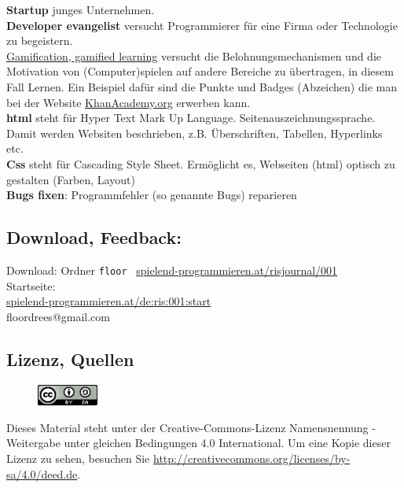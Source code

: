 \documentclass[10pt,a4paper,ngerman,twoside]{article} %
\begin{document}
\begin{multicols}{3}
\textbf{Startup} junges Unternehmen. \\

\textbf{Developer evangelist} versucht Programmierer für eine Firma oder Technologie zu begeistern. \\

\href{https://de.wikipedia.org/wiki/Gamification}{Gamification, gamified learning} versucht die Belohnungsmechanismen und die Motivation von (Computer)spielen auf andere Bereiche zu übertragen, in diesem Fall Lernen. Ein Beispiel dafür sind die Punkte und Badges (Abzeichen) die man bei der Website \href{http://khanacademy.org}{KhanAcademy.org} erwerben kann. \\
 
\textbf{html} steht für Hyper Text Mark Up Language. Seitenauszeichnungssprache. Damit werden Websiten beschrieben, z.B. Überschriften, Tabellen, Hyperlinks etc. \\

\textbf{Css} steht für Cascading Style Sheet. Ermöglicht es, Webseiten (html) optisch zu gestalten (Farben, Layout) \\

\textbf{Bugs fixen}: Programmfehler (so genannte Bugs) reparieren \\


\subsection*{Download, Feedback:}
\footnotesize{
Download: Ordner \texttt{floor} \Mundus\ \href{http://spielend-programmieren.at/risjournal/001}{spielend-programmieren.at/risjournal/001}\\
Startseite:\\
\href{http://spielend-programmieren.at/de:ris:001:start}{spielend-programmieren.at/de:ris:001:start}\\ 
\Letter\:  floordrees@gmail.com \\}
\normalsize
 

\subsection*{Lizenz, Quellen}

\begin{figure}
\includegraphics[width=2cm]{floor/ccbysa88x31.png}
\end{figure}
Dieses Material steht unter der Creative-Commons-Lizenz Namensnennung - Weitergabe unter gleichen Bedingungen 4.0 International. Um eine Kopie dieser Lizenz zu sehen, besuchen Sie \url{http://creativecommons.org/licenses/by-sa/4.0/deed.de}.


\end{multicols}
\end{document}
